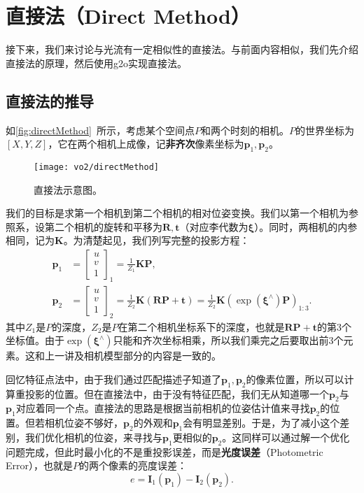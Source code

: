 \section{直接法（Direct Method）}
接下来，我们来讨论与光流有一定相似性的直接法。与前面内容相似，我们先介绍直接法的原理，然后使用g2o实现直接法。

\subsection{直接法的推导}

如\autoref{fig:directMethod}~所示，考虑某个空间点$P$和两个时刻的相机。$P$的世界坐标为$[X,Y,Z]$，它在两个相机上成像，记\textbf{非齐次}像素坐标为$\bm{p}_1, \bm{p}_2$。

\begin{figure}[!htp]
	\centering
	\texttt{[image: vo2/directMethod]}
	\caption{直接法示意图。}
	\label{fig:directMethod}
\end{figure}

我们的目标是求第一个相机到第二个相机的相对位姿变换。我们以第一个相机为参照系，设第二个相机的旋转和平移为$\bm{R}, \bm{t}$（对应李代数为$\bm{\xi}$）。同时，两相机的内参相同，记为$\bm{K}$。为清楚起见，我们列写完整的投影方程：
\newpage
\vspace*{-2\baselineskip}
\begin{align*}
{\bm{p}_1} &= {\left[ \begin{array}{l}
	u\\
	v\\
	1
	\end{array} \right]_1} = \frac{1}{Z_1} \bm{KP}, \\
{\bm{p}_2} &= {\left[ \begin{array}{l}
	u\\
	v\\
	1
	\end{array} \right]_2} = \frac{1}{Z_2} \bm{K}\left( {\bm{RP} +\bm{t}} \right) = \frac{1}{Z_2} \bm{K} \left( \exp \left( {{\bm{\xi} ^ \wedge }} \right) {\bm{P}} \right)_{1:3}.
\end{align*}
其中$Z_1$是$P$的深度，$Z_2$是$P$在第二个相机坐标系下的深度，也就是$\bm{RP}+\bm{t}$的第3个坐标值。由于$\exp(\bm{\xi}^\wedge)$只能和齐次坐标相乘，所以我们乘完之后要取出前3个元素。这和上一讲及相机模型部分的内容是一致的。

回忆特征点法中，由于我们通过匹配描述子知道了$\bm{p}_1, \bm{p}_2$的像素位置，所以可以计算重投影的位置。但在直接法中，由于没有特征匹配，我们无从知道哪一个$\bm{p}_2$与$\bm{p}_1$对应着同一个点。直接法的思路是根据当前相机的位姿估计值来寻找$\bm{p}_2$的位置。但若相机位姿不够好，$\bm{p}_2$的外观和$\bm{p}_1$会有明显差别。于是，为了减小这个差别，我们优化相机的位姿，来寻找与$\bm{p}_1$更相似的$\bm{p}_2$。这同样可以通过解一个优化问题完成，但此时最小化的不是重投影误差，而是\textbf{光度误差}（Photometric Error），也就是$P$的两个像素的亮度误差：
\begin{equation}
e = {\bm{I}_1}\left( {{\bm{p}_1}} \right) - {\bm{I}_2}\left( {{\bm{p}_2}} \right).
\end{equation}


